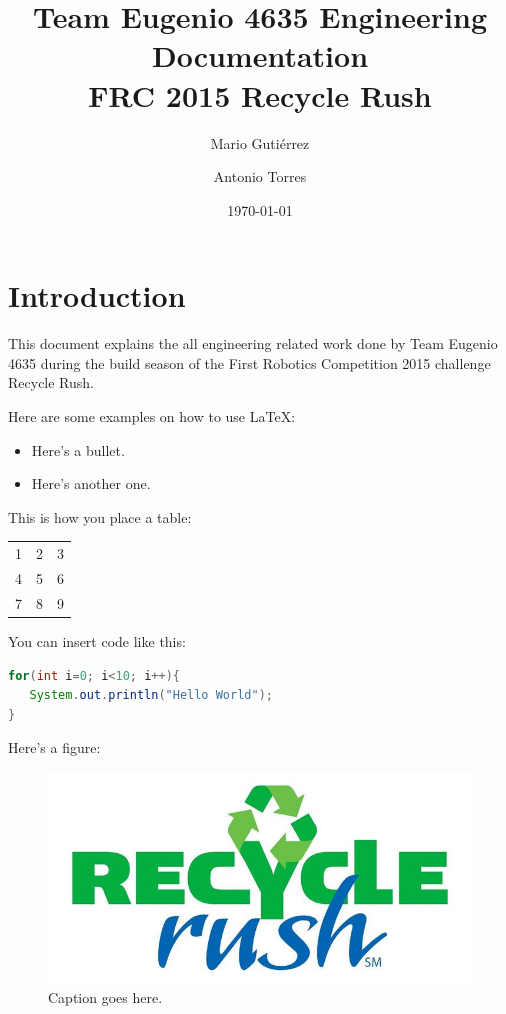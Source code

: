 \documentclass[%
 reprint, %
 amsmath,amssymb,
 aps,
 pra,
]{revtex4-1}
\begin{document}
\title{Team Eugenio 4635 Engineering Documentation \\ FRC 2015 Recycle Rush}

\author{Mario Gutiérrez}

\author{Antonio Torres}

\date{\today}

\maketitle


\section{Introduction}
This document explains the all engineering related work done by Team Eugenio 4635 during the build season of the First Robotics Competition 2015 challenge Recycle Rush.

Here are some examples on how to use \LaTeX :
\begin{itemize}
\item Here's a bullet.
\item Here's another one.
\end{itemize}

This is how you place a table:
\begin{tabular}{ l c r }
  1 & 2 & 3 \\
  4 & 5 & 6 \\
  7 & 8 & 9 \\
\end{tabular}

You can insert code like this:
\begin{lstlisting}[language=Java]
for(int i=0; i<10; i++){
   System.out.println("Hello World");
}
\end{lstlisting}

Here's a figure:
\begin{figure}[H]
    \includegraphics[width = \columnwidth]{RecycleRush}
    \caption{Caption goes here.} 
\end{figure}
\end{document}
